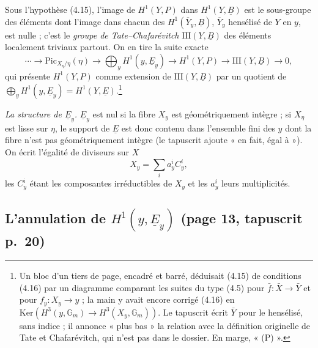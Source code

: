 \documentclass[11pt,a4paper]{article}
\begin{document}
Sous l'hypothèse (4.15), l'image de $H^{1}(Y,P)$ dans
$H^{1}(Y,\underline{B})$ est le sous-groupe des éléments dont l'image dans
chacun des $H^{1}(\overline{Y}_{y},\underline{B})$, $\overline{Y}_{y}$ hensélisé
de $Y$ en $y$, est nulle ; c'est le \emph{groupe de Tate--Chafarévitch}
$\mathrm{III}(Y,\underline{B})$ des éléments localement triviaux
partout. On en tire la suite exacte
\[
  \cdots \to \mathrm{Pic}_{X_{\eta}/\eta}(\eta) \to \bigoplus_{y}
  H^{1}(y,\underline{E}_{y}) \to H^{1}(Y,P) \to
  \mathrm{III}(Y,\underline{B}) \to 0, \tag{4.17}
\]
qui présente $H^{1}(Y,P)$ comme extension de $\mathrm{III}(Y,\underline{B})$
par un quotient de $\bigoplus_{y} H^{1}(y,\underline{E}_{y}) =
H^{1}(Y,\underline{E})$.\footnote{Un bloc d'un tiers de page, encadré et
barré, déduisait (4.15) de conditions (4.16) par un diagramme comparant les
suites du type (4.5) pour $\bar{f} : \bar{X} \to \bar{Y}$ et pour $f_{y} :
X_{y} \to y$ ; la main y avait encore corrigé (4.16) en
$\mathrm{Ker}(H^{3}(y,\mathbb{G}_{m}) \to H^{3}(X_{y},\mathbb{G}_{m}))$.
Le tapuscrit écrit $\bar{Y}$ pour le hensélisé, sans indice ; il annonce
« plus bas » la relation avec la définition originelle de Tate et
Chafarévitch, qui n'est pas dans le dossier. En marge, « (P) ».}

\emph{La structure de $\underline{E}_{y}$.} $\underline{E}_{y}$ est nul si
la fibre $X_{y}$ est géométriquement intègre ; si $X_{\eta}$ est lisse sur
$\eta$, le support de $\underline{E}$ est donc contenu dans l'ensemble fini
des $y$ dont la fibre n'est pas géométriquement intègre (le tapuscrit ajoute
« en fait, égal à »). On écrit l'égalité de diviseurs sur $X$
\[
  X_{y} = \textstyle\sum_{i} a_{y}^{i} C_{y}^{i}, \tag{4.18}
\]
les $C_{y}^{i}$ étant les composantes irréductibles de $X_{y}$ et les
$a_{y}^{i}$ leurs multiplicités.

\subsection*{L'annulation de $H^{1}(y,\underline{E}_{y})$ (page 13, tapuscrit p.\ 20)}
\end{document}
